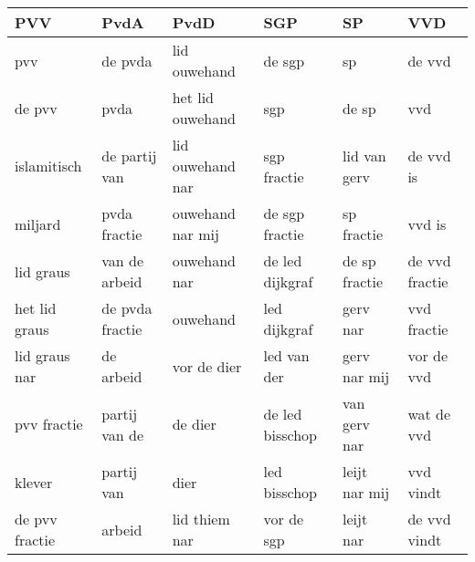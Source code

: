 \begin{tabular}{llllll}
\toprule
            PVV &             PvdA &              PvdD &              SGP &             SP &             VVD \\
\midrule
            pvv &          de pvda &      lid ouwehand &           de sgp &             sp &          de vvd \\
         de pvv &             pvda &  het lid ouwehand &              sgp &          de sp &             vvd \\
    islamitisch &    de partij van &  lid ouwehand nar &      sgp fractie &   lid van gerv &       de vvd is \\
        miljard &     pvda fractie &  ouwehand nar mij &   de sgp fractie &     sp fractie &          vvd is \\
      lid graus &    van de arbeid &      ouwehand nar &  de led dijkgraf &  de sp fractie &  de vvd fractie \\
  het lid graus &  de pvda fractie &          ouwehand &     led dijkgraf &       gerv nar &     vvd fractie \\
  lid graus nar &        de arbeid &       vor de dier &      led van der &   gerv nar mij &      vor de vvd \\
    pvv fractie &    partij van de &           de dier &  de led bisschop &   van gerv nar &      wat de vvd \\
         klever &       partij van &              dier &     led bisschop &  leijt nar mij &       vvd vindt \\
 de pvv fractie &           arbeid &     lid thiem nar &       vor de sgp &      leijt nar &    de vvd vindt \\
\bottomrule
\end{tabular}
